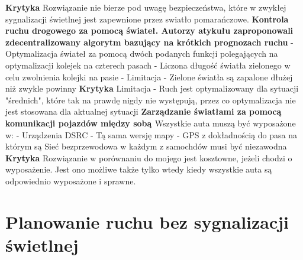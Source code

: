 \newline
\newline
\textbf{Krytyka}
\newline
Rozwiązanie nie bierze pod uwagę bezpieczeństwa, które w zwykłej sygnalizacji świetlnej jest zapewnione przez swiatło pomarańczowe.
\newline
\newline
\textbf{Kontrola ruchu drogowego za pomocą świateł. Autorzy atykułu \cite{lammer2008self} zaproponowali zdecentralizowany algorytm bazujący na krótkich prognozach ruchu}
  \newline
  - Optymalizacja świateł za pomocą dwóch podanych funkcji polegających na optymalizacji kolejek na czterech pasach
  \newline
	- Liczona długość światła zielonego w celu zwolnienia kolejki na pasie
  \newline
  - Limitacja - Zielone światła są zapalone dłużej niż zwykle powinny
\newline
\newline
\textbf{Krytyka}
\newline
Limitacja - Ruch jest optymalizowany dla sytuacji "średnich", które tak na prawdę nigdy nie występują, przez co optymalizacja nie jest stosowana dla aktualnej sytuacji
\newpage
\textbf{Zarządzanie światłami za pomocą komunikacji pojazdów między sobą \cite{ferreira2010self}}
\newline
Wszystkie auta muszą być wyposażone w:
\newline
	- Urządzenia DSRC
\newline
  - Tą sama wersję mapy
\newline
	- GPS z dokładnością do pasa na którym są
\newline
Sieć bezprzewodowa w każdym z samochdów musi być niezawodna
\newline
\newline
\textbf{Krytyka}
\newline
Rozwiązanie w porównaniu do mojego jest kosztowne, jeżeli chodzi o wyposażenie. Jest ono możliwe także tylko wtedy kiedy wszystkie auta są odpowiednio wyposażone i sprawne.
    
\section{Planowanie ruchu bez sygnalizacji świetlnej}

